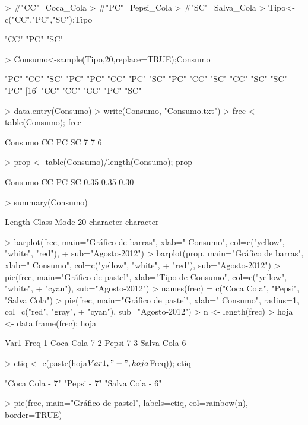 \documentclass{article}
\begin{document}
\begin{Schunk}
\begin{Sinput}
> #"CC"=Coca_Cola
> #"PC"=Pepsi_Cola
> #"SC"=Salva_Cola
> Tipo<-c("CC","PC","SC");Tipo
\end{Sinput}
\begin{Soutput}
[1] "CC" "PC" "SC"
\end{Soutput}
\begin{Sinput}
> Consumo<-sample(Tipo,20,replace=TRUE);Consumo
\end{Sinput}
\begin{Soutput}
 [1] "PC" "CC" "SC" "PC" "PC" "CC" "PC" "SC" "PC" "CC" "SC" "CC" "SC" "SC" "PC"
[16] "CC" "CC" "CC" "PC" "SC"
\end{Soutput}
\begin{Sinput}
> data.entry(Consumo)
> write(Consumo, "Consumo.txt")
> frec <- table(Consumo); frec
\end{Sinput}
\begin{Soutput}
Consumo
CC PC SC 
 7  7  6 
\end{Soutput}
\begin{Sinput}
> prop <- table(Consumo)/length(Consumo); prop
\end{Sinput}
\begin{Soutput}
Consumo
  CC   PC   SC 
0.35 0.35 0.30 
\end{Soutput}
\begin{Sinput}
> summary(Consumo)
\end{Sinput}
\begin{Soutput}
   Length     Class      Mode 
       20 character character 
\end{Soutput}
\begin{Sinput}
> barplot(frec, main="Gráfico de barras", xlab=" Consumo", col=c("yellow", "white", "red"),
+ sub="Agosto-2012")
> barplot(prop, main="Gráfico de barras", xlab=" Consumo\n", col=c("yellow", "white",
+ "red"), sub="Agosto-2012")
> pie(frec, main="Gráfico de pastel", xlab="Tipo de Consumo", col=c("yellow", "white",
+ "cyan"), sub="Agosto-2012")
> names(frec) = c("Coca Cola", "Pepsi", "Salva Cola")
> pie(frec, main="Gráfico de pastel", xlab=" Consumo", radius=1, col=c("red", "gray",
+ "cyan"), sub="Agosto-2012")
> n <- length(frec)
> hoja <- data.frame(frec); hoja
\end{Sinput}
\begin{Soutput}
        Var1 Freq
1  Coca Cola    7
2      Pepsi    7
3 Salva Cola    6
\end{Soutput}
\begin{Sinput}
> etiq <- c(paste(hoja$Var1, "-", hoja$Freq)); etiq
\end{Sinput}
\begin{Soutput}
[1] "Coca Cola - 7"  "Pepsi - 7"      "Salva Cola - 6"
\end{Soutput}
\begin{Sinput}
> pie(frec, main="Gráfico de pastel", labels=etiq, col=rainbow(n), border=TRUE)
\end{Sinput}
\end{Schunk}
\end{document}
